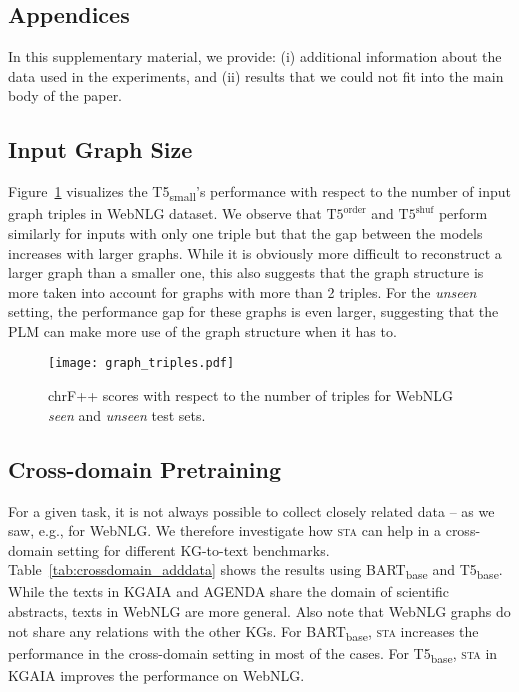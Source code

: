 \documentclass[11pt,a4paper]{article}
\newcommand{\shufmodel}[3]{\ensuremath{\text{#1}^{\text{#3}}}}
\begin{document}
\begin{table*}[t]



\clearpage

\appendix

\section{Appendices}

In this supplementary material, we provide: (i) additional information about the data used in the experiments, and (ii) results that we could not fit into the main body of the paper.

\subsection{Input Graph Size}
\label{section:inputgraphsize}
Figure~\ref{fig:graphs-triples} visualizes the T5\textsubscript{small}'s performance with respect to the number of input graph triples in WebNLG dataset.
We observe that \shufmodel{T5}{small}{order} and \shufmodel{T5}{small}{shuf} perform similarly for inputs with only one triple but that the gap between the models increases with larger graphs. While it is obviously more difficult to reconstruct a larger graph than a smaller one, this also suggests that the graph structure is more taken into account for graphs with more than 2 triples.
For the \textit{unseen} setting, the performance gap for these graphs is even larger, suggesting that the PLM can make more use of the graph structure when it has to.

 \begin{figure}[h]
    \centering
    \texttt{[image: graph\_triples.pdf]}
    \caption{chrF++ scores with respect to the number of triples for WebNLG \textit{seen} and \textit{unseen} test sets.}
    \label{fig:graphs-triples}
\end{figure}

\subsection{Cross-domain Pretraining}


For a given task, it is not always possible to collect closely related data -- as we saw, e.g., for WebNLG.
We therefore investigate how \textsc{sta} can help in a cross-domain setting for different KG-to-text benchmarks.
Table~\ref{tab:crossdomain_adddata} shows the results using BART\textsubscript{base} and T5\textsubscript{base}. While the texts in KGAIA and AGENDA share the domain of scientific abstracts, texts in WebNLG are more general. Also note that WebNLG graphs do not share any relations with the other KGs. For BART\textsubscript{base}, \textsc{sta} increases the performance in the cross-domain setting in most of the cases. For T5\textsubscript{base}, \textsc{sta} in KGAIA improves the performance on WebNLG.


\end{table*}
\end{document}
